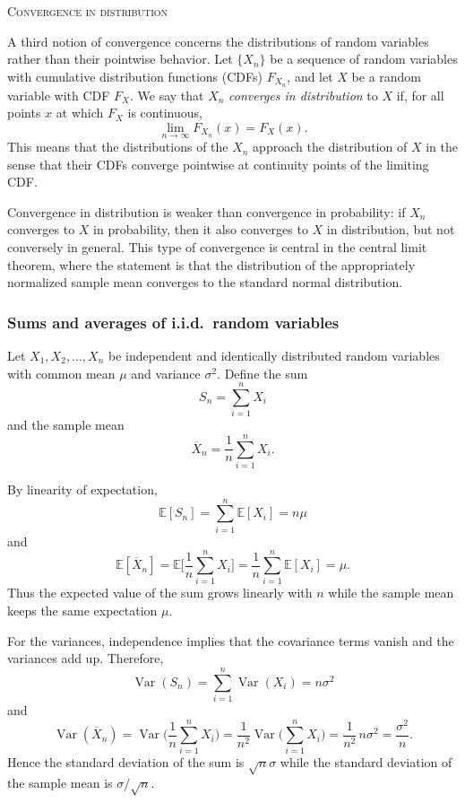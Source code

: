 \bigskip
\textsc{Convergence in distribution}

A third notion of convergence concerns the distributions of random variables rather than their pointwise behavior.  
Let \(\{X_n\}\) be a sequence of random variables with cumulative distribution functions (CDFs) \(F_{X_n}\), and let \(X\) be a random variable with CDF \(F_X\).  
We say that \(X_n\) \textit{converges in distribution} to \(X\) if, for all points \(x\) at which \(F_X\) is continuous,
\[
\lim_{n \to \infty} F_{X_n}(x) = F_X(x).
\]
This means that the distributions of the \(X_n\) approach the distribution of \(X\) in the sense that their CDFs converge pointwise at continuity points of the limiting CDF.  

Convergence in distribution is weaker than convergence in probability: if \(X_n\) converges to \(X\) in probability, then it also converges to \(X\) in distribution, but not conversely in general.  
This type of convergence is central in the central limit theorem, where the statement is that the distribution of the appropriately normalized sample mean converges to the standard normal distribution.



\subsubsection{Sums and averages of i.i.d.\ random variables}

Let \(X_1, X_2, \ldots, X_n\) be independent and identically distributed random variables with common mean \(\mu\) and variance \(\sigma^2\).  
Define the sum
\[
S_n = \sum_{i=1}^{n} X_i
\]
and the sample mean
\[
\overline{X}_n = \frac{1}{n}\sum_{i=1}^{n} X_i.
\]

By linearity of expectation,
\[
\mathbb{E}[S_n] = \sum_{i=1}^{n} \mathbb{E}[X_i] = n\mu
\]
and
\[
\mathbb{E}[\overline{X}_n] = \mathbb{E}\Big[\frac{1}{n}\sum_{i=1}^{n} X_i\Big] = \frac{1}{n}\sum_{i=1}^{n} \mathbb{E}[X_i] = \mu.
\]
Thus the expected value of the sum grows linearly with \(n\) while the sample mean keeps the same expectation \(\mu\).

For the variances, independence implies that the covariance terms vanish and the variances add up.  
Therefore,
\[
\operatorname{Var}(S_n)
=
\sum_{i=1}^{n} \operatorname{Var}(X_i)
=
n\sigma^2
\]
and
\[
\operatorname{Var}(\overline{X}_n)
=
\operatorname{Var}\Big(\frac{1}{n}\sum_{i=1}^{n} X_i\Big)
=
\frac{1}{n^2}\operatorname{Var}\Big(\sum_{i=1}^{n} X_i\Big)
=
\frac{1}{n^2}\,n\sigma^2
=
\frac{\sigma^2}{n}.
\]
Hence the standard deviation of the sum is \(\sqrt{n}\sigma\) while the standard deviation of the sample mean is \(\sigma/\sqrt{n}\).

